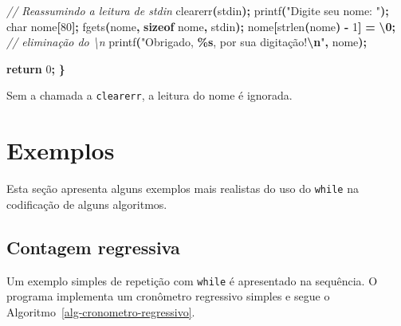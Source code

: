 \documentclass[
  11pt,
  a4paper,
]{scrbook}
\newenvironment{Shaded}{\begin{snugshade}}{\end{snugshade}}
\newcommand{\CharTok}[1]{\textcolor[rgb]{0.31,0.60,0.02}{#1}}
\newcommand{\CommentTok}[1]{\textcolor[rgb]{0.56,0.35,0.01}{\textit{#1}}}
\newcommand{\ControlFlowTok}[1]{\textcolor[rgb]{0.13,0.29,0.53}{\textbf{#1}}}
\newcommand{\DataTypeTok}[1]{\textcolor[rgb]{0.13,0.29,0.53}{#1}}
\newcommand{\DecValTok}[1]{\textcolor[rgb]{0.00,0.00,0.81}{#1}}
\newcommand{\KeywordTok}[1]{\textcolor[rgb]{0.13,0.29,0.53}{\textbf{#1}}}
\newcommand{\NormalTok}[1]{#1}
\newcommand{\OperatorTok}[1]{\textcolor[rgb]{0.81,0.36,0.00}{\textbf{#1}}}
\newcommand{\SpecialCharTok}[1]{\textcolor[rgb]{0.81,0.36,0.00}{\textbf{#1}}}
\newcommand{\StringTok}[1]{\textcolor[rgb]{0.31,0.60,0.02}{#1}}
\begin{document}
\begin{tcolorbox}
\begin{Shaded}
\begin{Highlighting}[]
    \CommentTok{// Reassumindo a leitura de stdin}
\NormalTok{    clearerr}\OperatorTok{(}\NormalTok{stdin}\OperatorTok{);}
\NormalTok{    printf}\OperatorTok{(}\StringTok{"Digite seu nome: "}\OperatorTok{);}
    \DataTypeTok{char}\NormalTok{ nome}\OperatorTok{[}\DecValTok{80}\OperatorTok{];}
\NormalTok{    fgets}\OperatorTok{(}\NormalTok{nome}\OperatorTok{,} \KeywordTok{sizeof}\NormalTok{ nome}\OperatorTok{,}\NormalTok{ stdin}\OperatorTok{);}
\NormalTok{    nome}\OperatorTok{[}\NormalTok{strlen}\OperatorTok{(}\NormalTok{nome}\OperatorTok{)} \OperatorTok{{-}} \DecValTok{1}\OperatorTok{]} \OperatorTok{=} \CharTok{\textquotesingle{}}\SpecialCharTok{\textbackslash{}0}\CharTok{\textquotesingle{}}\OperatorTok{;}  \CommentTok{// eliminação do \textbackslash{}n}
\NormalTok{    printf}\OperatorTok{(}\StringTok{"Obrigado, }\SpecialCharTok{\%s}\StringTok{, por sua digitação!}\SpecialCharTok{\textbackslash{}n}\StringTok{"}\OperatorTok{,}\NormalTok{ nome}\OperatorTok{);}

    \ControlFlowTok{return} \DecValTok{0}\OperatorTok{;}
\OperatorTok{\}}
\end{Highlighting}
\end{Shaded}

Sem a chamada a \texttt{clearerr}, a leitura do nome é ignorada.

\end{tcolorbox}

\section{Exemplos}\label{exemplos}

Esta seção apresenta alguns exemplos mais realistas do uso do
\texttt{while} na codificação de alguns algoritmos.

\subsection{Contagem regressiva}\label{contagem-regressiva}

Um exemplo simples de repetição com \texttt{while} é apresentado na
sequência. O programa implementa um cronômetro regressivo simples e
segue o Algoritmo~\ref{alg-cronometro-regressivo}.
\end{document}

